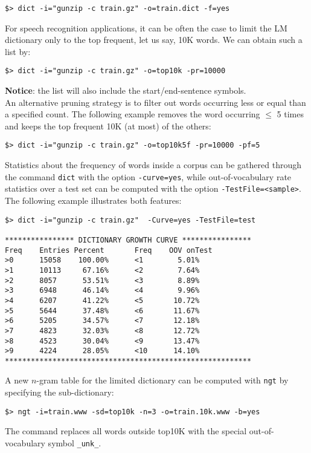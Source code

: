 \documentclass[11pt]{article}
\begin{document}
\begin{verbatim}
$> dict -i="gunzip -c train.gz" -o=train.dict -f=yes
\end{verbatim}

\noindent
For speech recognition applications, it  can be often the case to limit the LM dictionary  only to the top frequent, let us say,
10K words. We can obtain such a list by:
\begin{verbatim}
$> dict -i="gunzip -c train.gz" -o=top10k -pr=10000
\end{verbatim}


\noindent
{\bf Notice}: the list will also include the start/end-sentence symbols.\\

\noindent
An alternative pruning strategy is to filter out words occurring less or equal than a specified 
count. The following example removes the word occurring $\le$ 5 times and keeps
the top frequent 10K (at most) of the others:
\begin{verbatim}
$> dict -i="gunzip -c train.gz" -o=top10k5f -pr=10000 -pf=5
\end{verbatim}


\noindent
Statistics about the frequency of words inside a corpus can be gathered through  the command {\tt dict}
with the option {\tt -curve=yes}, while out-of-vocabulary rate statistics over a test set can be computed with
the option {\tt -TestFile=<sample>}.  The following example illustrates both features:
\begin{verbatim}
$> dict -i="gunzip -c train.gz"  -Curve=yes -TestFile=test

**************** DICTIONARY GROWTH CURVE ****************
Freq    Entries Percent       Freq    OOV onTest
>0      15058    100.00%      <1        5.01%
>1      10113     67.16%      <2        7.64%
>2      8057      53.51%      <3        8.89%
>3      6948      46.14%      <4        9.96%
>4      6207      41.22%      <5       10.72%
>5      5644      37.48%      <6       11.67%
>6      5205      34.57%      <7       12.18%
>7      4823      32.03%      <8       12.72%
>8      4523      30.04%      <9       13.47%
>9      4224      28.05%      <10      14.10%
*********************************************************

\end{verbatim}

\noindent
A new  $n$-gram table for the  limited dictionary can  be computed with {\tt ngt} by specifying 
the sub-dictionary:
\begin{verbatim}
$> ngt -i=train.www -sd=top10k -n=3 -o=train.10k.www -b=yes
\end{verbatim}
The command replaces  all words outside  top10K with  the special
out-of-vocabulary symbol {\tt \_unk\_}.
\end{document}

